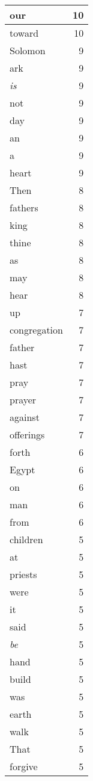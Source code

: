 \begin{center}
\begin{longtable}{l|r}
our & 10 \\ \hline
toward & 10 \\ \hline
Solomon & 9 \\ \hline
ark & 9 \\ \hline
\emph{is} & 9 \\ \hline
not & 9 \\ \hline
day & 9 \\ \hline
an & 9 \\ \hline
a & 9 \\ \hline
heart & 9 \\ \hline
Then & 8 \\ \hline
fathers & 8 \\ \hline
king & 8 \\ \hline
thine & 8 \\ \hline
as & 8 \\ \hline
may & 8 \\ \hline
hear & 8 \\ \hline
up & 7 \\ \hline
congregation & 7 \\ \hline
father & 7 \\ \hline
hast & 7 \\ \hline
pray & 7 \\ \hline
prayer & 7 \\ \hline
against & 7 \\ \hline
offerings & 7 \\ \hline
forth & 6 \\ \hline
Egypt & 6 \\ \hline
on & 6 \\ \hline
man & 6 \\ \hline
from & 6 \\ \hline
children & 5 \\ \hline
at & 5 \\ \hline
priests & 5 \\ \hline
were & 5 \\ \hline
it & 5 \\ \hline
said & 5 \\ \hline
\emph{be} & 5 \\ \hline
hand & 5 \\ \hline
build & 5 \\ \hline
was & 5 \\ \hline
earth & 5 \\ \hline
walk & 5 \\ \hline
That & 5 \\ \hline
forgive & 5 \\ \hline

\end{longtable}
\end{center}
